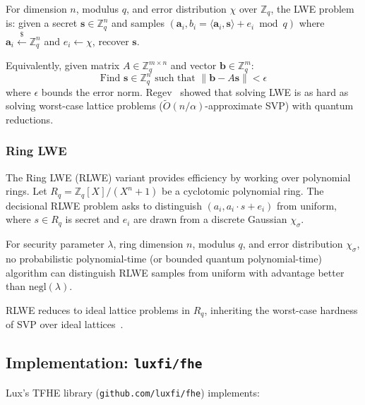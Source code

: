 \begin{definition}
For dimension $n$, modulus $q$, and error distribution $\chi$ over
$\mathbb{Z}_q$, the LWE problem is: given a secret
$\mathbf{s} \in \mathbb{Z}_q^n$ and samples
$(\mathbf{a}_i, b_i = \langle \mathbf{a}_i, \mathbf{s} \rangle
+ e_i \bmod q)$ where $\mathbf{a}_i \xleftarrow{\$} \mathbb{Z}_q^n$
and $e_i \leftarrow \chi$, recover $\mathbf{s}$.

Equivalently, given matrix $A \in \mathbb{Z}_q^{m \times n}$ and
vector $\mathbf{b} \in \mathbb{Z}_q^m$:
\[
\text{Find } \mathbf{s} \in \mathbb{Z}_q^n
\text{ such that }
\|\mathbf{b} - A\mathbf{s}\| < \epsilon
\]
where $\epsilon$ bounds the error norm. Regev~\cite{regev2005} showed
that solving LWE is as hard as solving worst-case lattice problems
($\widetilde{O}(n/\alpha)$-approximate SVP) with quantum reductions.
\end{definition}

\subsubsection{Ring LWE}

The Ring LWE (RLWE) variant provides efficiency by working over
polynomial rings. Let $R_q = \mathbb{Z}_q[X]/(X^n + 1)$ be a
cyclotomic polynomial ring. The decisional RLWE problem asks to
distinguish $(a_i, a_i \cdot s + e_i)$ from uniform, where
$s \in R_q$ is secret and $e_i$ are drawn from a discrete Gaussian
$\chi_\sigma$.

\begin{definition}
For security parameter $\lambda$, ring dimension $n$, modulus $q$,
and error distribution $\chi_\sigma$, no probabilistic
polynomial-time (or bounded quantum polynomial-time) algorithm can
distinguish RLWE samples from uniform with advantage better than
$\mathrm{negl}(\lambda)$.
\end{definition}

RLWE reduces to ideal lattice problems in $R_q$, inheriting the
worst-case hardness of SVP over ideal lattices~\cite{lpr2013}.

\subsection{Implementation: \texttt{luxfi/fhe}}

Lux's TFHE library (\texttt{github.com/luxfi/fhe}) implements:


